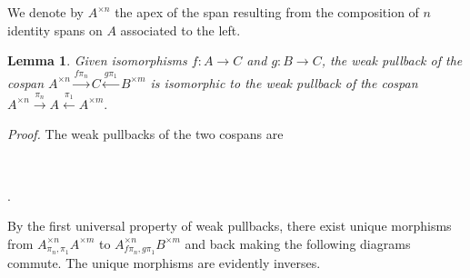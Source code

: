 \documentclass[12pt,twoside,openright]{report}
\newtheorem{lemma}{Lemma}
\newcommand{\maps}{\colon}
\begin{document}
We denote by $A^{\times n}$ the apex of the span resulting from the composition of $n$ identity spans on $A$ associated to the left.

\begin{lemma}
  \label{piling}
  Given isomorphisms $f\maps A \to C$ and $g\maps B \to C$, the weak pullback of the cospan $A^{\times n} \stackrel{f\pi_n}{\to} C \stackrel{g\pi_1}{\leftarrow} B^{\times m}$ is isomorphic to the weak pullback of the cospan $A^{\times n} \stackrel{\pi_n}{\to} A \stackrel{\pi_1}{\leftarrow} A^{\times m}.$
\end{lemma}
{\em Proof.}  
The weak pullbacks of the two cospans are
\begin{center}
  $\quad \quad$
  .
\end{center}
By the first universal property of weak pullbacks, there exist unique morphisms from $A^{\times n}_{\pi_n,\pi_1}A^{\times m}$ to $A^{\times n}_{f\pi_n,g\pi_1}B^{\times m}$ and back making the following diagrams commute.  The unique morphisms are evidently inverses.
\end{document}
